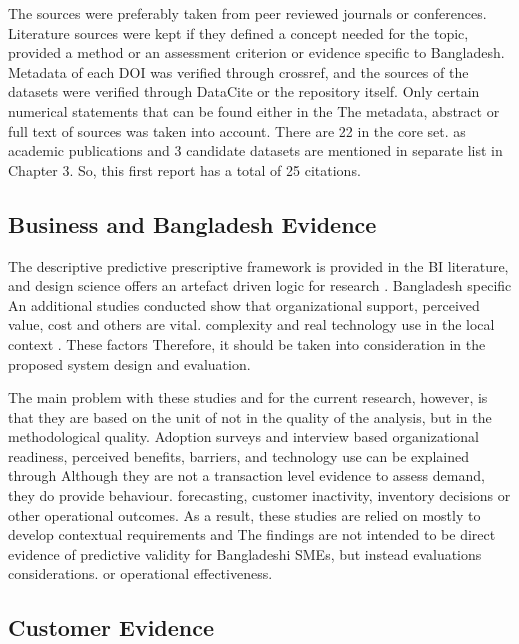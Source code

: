 \documentclass[a4paper,11pt,oneside]{book}
\theoremstyle{plain}
\theoremstyle{definition}
\theoremstyle{remark}
\begin{document}
The sources were preferably taken from peer reviewed journals or conferences. Literature sources were kept if they defined a concept needed for the topic, provided a method or an assessment criterion or evidence specific to Bangladesh. Metadata of each DOI was verified through crossref, and the sources of the datasets were verified through DataCite or the repository itself. Only certain numerical statements that can be found either in the The metadata, abstract or full text of sources was taken into account. There are 22 in the core set. as academic publications and 3 candidate datasets are mentioned in separate list in Chapter 3. So, this first report has a total of 25 citations.

\subsection{Business and Bangladesh Evidence}

The descriptive predictive prescriptive framework \cite{chen2012business} is provided in the BI literature, and design science offers an artefact driven logic for research \cite{hevner2004design}. Bangladesh specific An additional studies conducted show that organizational support, perceived value, cost and others are vital. complexity and real technology use in the local context \cite{hazra2021mfs,hoque2016ict,shahadat2023digital}. These factors Therefore, it should be taken into consideration in the proposed system design and evaluation.

The main problem with these studies and for the current research, however, is that they are based on the unit of not in the quality of the analysis, but in the methodological quality. Adoption surveys and interview based organizational readiness, perceived benefits, barriers, and technology use can be explained through Although they are not a transaction level evidence to assess demand, they do provide behaviour. forecasting, customer inactivity, inventory decisions or other operational outcomes. As a result, these studies are relied on mostly to develop contextual requirements and The findings are not intended to be direct evidence of predictive validity for Bangladeshi SMEs, but instead evaluations considerations. or operational effectiveness.

\subsection{Customer Evidence}
\end{document}
